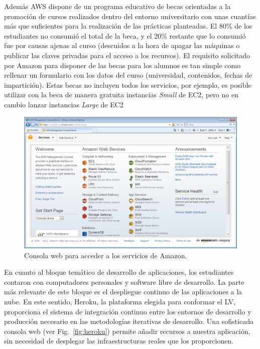 \documentclass[conference]{IEEEtran}
\begin{document}
Además AWS dispone de un programa educativo de becas orientadas a la promoción de cursos realizados dentro del entorno universitario con unas cuantías más que suficientes
para la realización de las prácticas planteadas. El 80\% de los estudiantes no consumió el total de la beca, y el 20\% restante que lo consumió fue por causas ajenas al curso
(descuidos a la hora de apagar las máquinas o publicar las claves privadas para el acceso a los recursos).
El requisito solicitado por Amazon para disponer de las becas para los alumnos es tan simple como rellenar un formulario con los datos del curso (universidad, contenidos, fechas de impartición).
Estas becas no incluyen todos los servicios, por ejemplo, es posible utilizar con la beca de manera gratuita instancias \textit{Small} de EC2, pero no en cambio lanzar instancias \textit{Large} de EC2

\begin{figure}[!t]
\centering
\includegraphics[width=\columnwidth]{aws_management_console_home.png}
\caption{Consola web para acceder a los servicios de Amazon.}
\label{fig:console}
\end{figure} 


En cuanto al bloque temático de desarrollo de aplicaciones, los estudiantes contaron con computadores personales y software libre de desarrollo.
La parte más relevante de este bloque es el despliegue continuo de las aplicaciones a la nube. En este sentido, Heroku, la plataforma elegida para conformar el LV, proporciona
el sistema de integración continuo entre los entornos de desarrollo y producción necesario en las metodologías iterativas de desarrollo.
Una sofisticada consola web (ver Fig.~\ref{fig:heroku}) permite añadir recursos a nuestra aplicación,
sin necesidad de desplegar las infraestructuras reales que los proporcionen.
\end{document}

